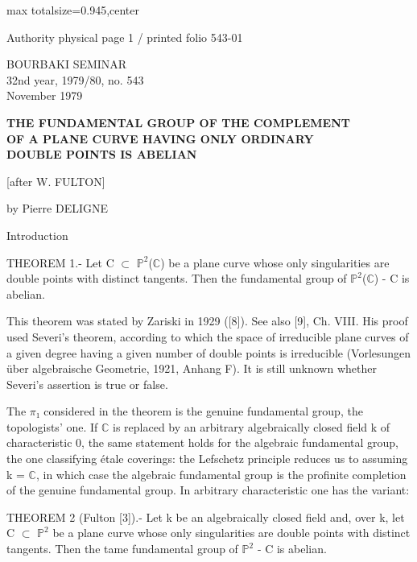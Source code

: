 \documentclass[10pt,a4paper]{article}
\begin{document}
\fontsize{8.05}{9.15}\selectfont
\noindent\begin{adjustbox}{max totalsize={\textwidth}{0.945\textheight},center}
\begin{minipage}{\textwidth}
\noindent\hfill\scriptsize Authority physical page 1 / printed folio 543-01\par\normalsize
\begin{center}BOURBAKI SEMINAR\\32nd year, 1979/80, no. 543\\November 1979\end{center}
\begin{center}\bfseries THE FUNDAMENTAL GROUP OF THE COMPLEMENT\\OF A PLANE CURVE HAVING ONLY ORDINARY\\DOUBLE POINTS IS ABELIAN\end{center}
\begin{center}[after W. FULTON]\end{center}
\begin{center}by Pierre DELIGNE\end{center}
\noindent Introduction\par\smallskip
\noindent THEOREM 1.- Let C \ensuremath{⊂} \ensuremath{ℙ^2}(\ensuremath{ℂ}) be a plane curve whose only singularities are double points with distinct tangents. Then the fundamental group of \ensuremath{ℙ^2}(\ensuremath{ℂ}) - C is abelian.\par\smallskip
\noindent This theorem was stated by Zariski in 1929 ([8]). See also [9], Ch. VIII. His proof used Severi's theorem, according to which the space of irreducible plane curves of a given degree having a given number of double points is irreducible (Vorlesungen über algebraische Geometrie, 1921, Anhang F). It is still unknown whether Severi's assertion is true or false.\par\smallskip
\noindent The \ensuremath{π₁} considered in the theorem is the genuine fundamental group, the topologists' one. If \ensuremath{ℂ} is replaced by an arbitrary algebraically closed field k of characteristic 0, the same statement holds for the algebraic fundamental group, the one classifying étale coverings: the Lefschetz principle reduces us to assuming k = \ensuremath{ℂ}, in which case the algebraic fundamental group is the profinite completion of the genuine fundamental group. In arbitrary characteristic one has the variant:\par\smallskip
\noindent THEOREM 2 (Fulton [3]).- Let k be an algebraically closed field and, over k, let C \ensuremath{⊂} \ensuremath{ℙ^2} be a plane curve whose only singularities are double points with distinct tangents. Then the tame fundamental group of \ensuremath{ℙ^2} - C is abelian.\par\smallskip

\end{minipage}
\end{adjustbox}
\end{document}
